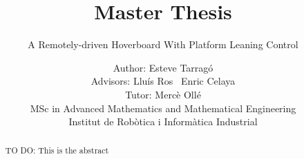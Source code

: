 \documentclass{scrartcl}
\title{Master Thesis}
\subtitle{A Remotely-driven Hoverboard With Platform Leaning Control}
\author{Author: Esteve Tarrag\'o \\
	Advisors: Llu\'is Ros \ Enric Celaya\\
	Tutor: Merc\`e Oll\'e\\
	MSc in Advanced Mathematics and Mathematical Engineering\\
	Institut de Robòtica i Informàtica Industrial
}
\begin{document}
\maketitle

\newpage
\begin{abstract}
	TO DO: This is the abstract
\end{abstract}

\newpage
\tableofcontents





\end{document}

